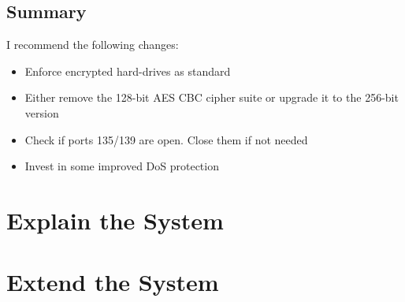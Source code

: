 \documentclass[12pt]{article}
\begin{document}
  \subsection{Summary}
  I recommend the following changes:
  \begin{itemize}
    \item Enforce encrypted hard-drives as standard
    \item Either remove the 128-bit AES CBC cipher suite or upgrade it to the 256-bit version
    \item Check if ports 135/139 are open. Close them if not needed
    \item Invest in some improved DoS protection
  \end{itemize}

  \section{Explain the System}

  \section{Extend the System}
\end{document}
